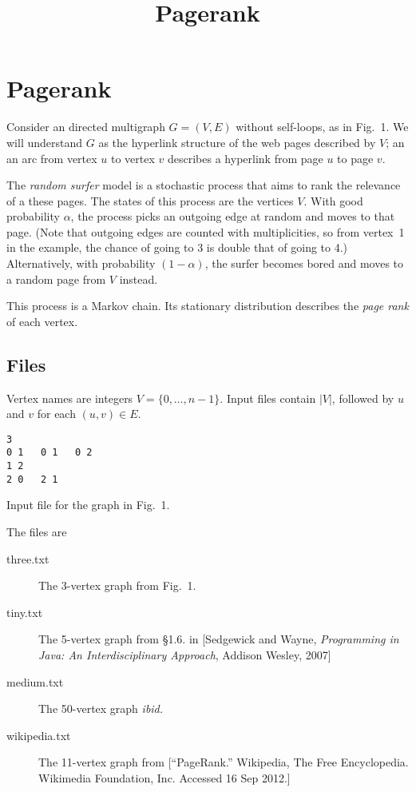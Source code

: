 \documentclass{tufte-handout}
\title{\sf Pagerank}
\begin{document}
\maketitle
{}

\section{Pagerank}
Consider an directed multigraph $G=(V,E)$ without self-loops, as in
Fig.~1.
We will understand $G$ as the hyperlink structure of the web pages
described by $V$; an an arc from vertex $u$ to vertex $v$ describes a
hyperlink from page $u$ to page $v$.

The \emph{random surfer} model is a stochastic process that aims to
rank the relevance of a these pages.
The states of this process are the vertices $V$.
With good probability $\alpha$, the process picks an outgoing edge at
random and moves to that page.
(Note that outgoing edges are counted with multiplicities, so from
vertex~1 in the example, the chance of going to 3 is double that of
going to 4.)
Alternatively, with probability $(1-\alpha)$, the surfer becomes bored
and moves to a random page from $V$ instead.

This process is a Markov chain.
Its stationary distribution describes the \emph{page rank} of each
vertex.

\subsection{Files}

Vertex names are integers $V= \{0,\ldots, n-1\}$.
Input files contain $|V|$, followed by $u$ and $v$ for each $(u,v)\in
E$.

\begin{marginnote}
\begin{verbatim}
3
0 1   0 1   0 2
1 2   
2 0   2 1
\end{verbatim}
\caption{Input file for the graph in Fig.~1.}
\end{marginnote}

The files are
\begin{description}
\item[three.txt] The 3-vertex graph from Fig.~1.
\item[tiny.txt] The 5-vertex graph from \S{}1.6. in [Sedgewick and Wayne,
  \emph{Programming in Java: An Interdisciplinary Approach}, Addison
  Wesley, 2007]
\item[medium.txt] The 50-vertex graph \emph{ibid.}
\item[wikipedia.txt] The 11-vertex graph from
  [``PageRank.'' Wikipedia, The Free Encyclopedia. Wikimedia
  Foundation, Inc. Accessed 16 Sep 2012.]

\end{description}
\end{document}
